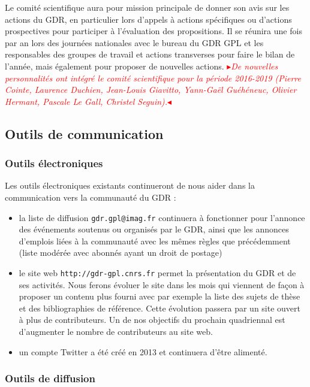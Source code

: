 \documentclass[11pt]{article}
\newcommand{\mynote}[3][black]{\textcolor{#1}{\fbox{\bfseries\sffamily\scriptsize{#2}}
{\small$\blacktriangleright$\textsf{\emph{#3}}$\blacktriangleleft$}}}
\newcommand{\TODO}[1]{\mynote[red]{TODO}{#1}}
\begin{document}
 \noindent
Le comité scientifique aura pour mission principale de donner son avis sur les
actions du GDR, en particulier lors d'appels à actions spécifiques ou d'actions
prospectives pour participer à l'évaluation des propositions.
Il se réunira une fois par an lors des journées nationales avec le bureau du
GDR GPL et les responsables des groupes de travail et actions transverses pour
faire le bilan de l'année, mais également pour proposer de nouvelles actions.
\TODO{De nouvelles personnalités ont intégré le comité scientifique pour la période
2016-2019 (Pierre Cointe, Laurence Duchien, Jean-Louis Giavitto, Yann-Gaël
Guéhéneuc, Olivier Hermant, Pascale Le Gall, Christel Seguin).}


\subsection{Outils de communication}

\subsubsection{Outils électroniques}

Les outils électroniques existants continueront de nous aider dans la communication vers la communauté du GDR :

\begin{itemize}
\item la liste de diffusion \texttt{gdr.gpl@imag.fr}  continuera à fonctionner
  pour l'annonce des événements soutenus ou organisés par le GDR, ainsi que les
  annonces d'emplois liées à la communauté avec les mêmes règles que
  précédemment (liste modérée avec abonnés ayant un droit de postage)

\item le site web  \texttt{http://gdr-gpl.cnrs.fr}  permet la présentation du
  GDR et de ses activités. Nous ferons évoluer le site dans les mois qui
  viennent de façon à proposer un contenu plus fourni avec par exemple la liste
  des sujets de thèse et des bibliographies de référence.
  Cette évolution passera par un site ouvert à plus de contributeurs.
  Un de nos objectifs du prochain quadriennal est d'augmenter le nombre de
  contributeurs au site web.

\item un compte Twitter a été créé en 2013 et continuera d'être alimenté.
\end{itemize}

\subsubsection{Outils de diffusion}
\end{document}
